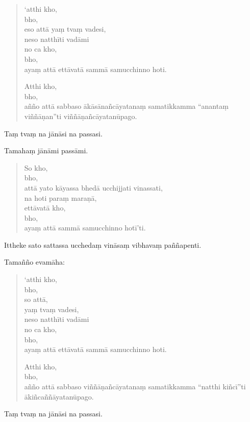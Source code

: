 \documentclass[11pt,twoside,openright]{book}
\begin{document}
\begin{verse}
‘atthi kho,\\
\vin  bho,\\
\vin  eso attā yaṃ tvaṃ vadesi,\\
\vin  neso natthīti vadāmi\\


no ca kho,\\
\vin  bho,\\
\vin  ayaṃ attā ettāvatā sammā samucchinno hoti.

Atthi kho,\\
\vin  bho,\\
\vin  añño attā sabbaso ākāsānañcāyatanaṃ samatikkamma “anantaṃ viññāṇan”ti viññāṇañcāyatanūpago.

\end{verse}
\pstart
Taṃ tvaṃ na jānāsi na passasi.
\pend

\pstart
Tamahaṃ jānāmi passāmi.
\pend

\begin{verse}
So kho,\\
\vin  bho,\\
\vin  attā yato kāyassa bhedā ucchijjati vinassati,\\
\vin  na hoti paraṃ maraṇā,\\
\vin  ettāvatā kho,\\
\vin  bho,\\
\vin  ayaṃ attā sammā samucchinno hotī’ti.

\end{verse}
\pstart
Ittheke sato sattassa ucchedaṃ vināsaṃ vibhavaṃ paññapenti.
\pend

\pstart
Tamañño evamāha:
\pend

\begin{verse}
‘atthi kho,\\
\vin  bho,\\
\vin  so attā,\\
\vin  yaṃ tvaṃ vadesi,\\
\vin  neso natthīti vadāmi\\


no ca kho,\\
\vin  bho,\\
\vin  ayaṃ attā ettāvatā sammā samucchinno hoti.

Atthi kho,\\
\vin  bho,\\
\vin  añño attā sabbaso viññāṇañcāyatanaṃ samatikkamma “natthi kiñcī”ti ākiñcaññāyatanūpago.

\end{verse}
\pstart
Taṃ tvaṃ na jānāsi na passasi.
\pend
\end{document}
